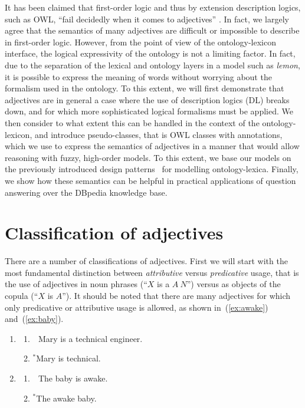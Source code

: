 \documentclass[11pt]{article}
\begin{document}
It has been claimed that first-order logic and thus by extension description 
logics, such as OWL, ``fail decidedly when it comes to adjectives''
\cite{bankston2003modeling}. In fact, we largely agree that the semantics 
of many adjectives are difficult or impossible to describe in first-order logic. 
However, from the point of view of the ontology-lexicon interface, the logical 
expressivity of the ontology is not a limiting factor. In fact, due to the 
separation of the lexical and ontology layers in a model such as \emph{lemon}, 
it is possible to express the meaning of words without worrying about the 
formalism used in the ontology. To this extent, we will first demonstrate that 
adjectives are in general a case where the use of description logics (DL) breaks down, 
and for which more sophisticated logical formalisms must be applied. We then 
consider to what extent this can be handled in the context of the 
ontology-lexicon, and introduce pseudo-classes, that is OWL classes with 
annotations, which we use to express the semantics of adjectives in a manner
that would allow reasoning with fuzzy, high-order models. To this extent, we base
our models on the previously introduced design patterns~\cite{mccrae2014design}
for modelling ontology-lexica. 
Finally, we show how these semantics can be helpful in practical applications 
of question answering over the DBpedia knowledge base.

\section{Classification of adjectives}

There are a number of classifications of adjectives. First we will start 
with the most fundamental distinction between \emph{attributive} versus 
\emph{predicative} usage, that is the use of adjectives in noun phrases 
(``$X$ is a $A~N$'') versus as objects of the copula (``$X$ is $A$''). 
It should be noted that there are many adjectives for which only predicative or 
attributive usage is allowed, as shown in~(\ref{ex:awake}) and~(\ref{ex:baby}).

\begin{enumerate}
\item \begin{enumerate}	
\item \ \,Mary is a technical engineer. \label{ex:engineer}
\item $^\ast$Mary is technical.
\end{enumerate}
\label{ex:technical}
\item \begin{enumerate}	
        \item \ \,The baby is awake. \label{ex:awake}
\item $^\ast$The awake baby.
\end{enumerate}
\label{ex:baby}
\end{enumerate}
\end{document}
